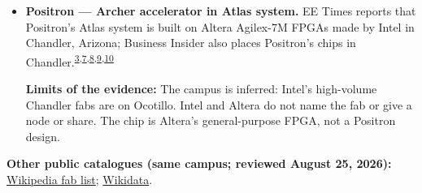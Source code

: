 \begin{minipage}[t][0.90\textheight][t]{\textwidth}
\begin{itemize}[leftmargin=1.25em,itemsep=0.35em,topsep=0.15em,parsep=0pt]
\item {\footnotesize\textbf{Positron --- Archer accelerator in Atlas system.} EE Times reports that Positron's Atlas system is built on Altera Agilex-7M FPGAs made by Intel in Chandler, Arizona; Business Insider also places Positron's chips in Chandler.\nobreak\textsuperscript{\href{\detokenize{https://web.archive.org/web/20260730143304/https://newsroom.intel.com/client-computing/intel-unveils-panther-lake-architecture-first-ai-pc-platform-built-on-18a}}{\textcolor{accent}{3}},\href{\detokenize{https://www.eetimes.com/startup-positron-takes-on-nvidia-with-fpgas/}}{\textcolor{accent}{7}},\href{\detokenize{https://finance.yahoo.com/news/pros-cons-making-advanced-chips-100002647.html}}{\textcolor{accent}{8}},\href{\detokenize{https://www.eetimes.com/positron-230-million-funding-led-by-financial-trading-firms/}}{\textcolor{accent}{9}},\href{\detokenize{https://www.positron.ai/atlas}}{\textcolor{accent}{10}}}\par {\scriptsize\color{black!62}\textbf{Limits of the evidence:} The campus is inferred: Intel's high-volume Chandler fabs are on Ocotillo. Intel and Altera do not name the fab or give a node or share. The chip is Altera's general-purpose FPGA, not a Positron design.\par}}
\end{itemize}
\smallskip
{\sffamily\scriptsize\color{black!62}\textbf{Other public catalogues (same campus; reviewed August 25, 2026):} \href{\detokenize{https://en.wikipedia.org/w/index.php?title=List_of_semiconductor_fabrication_plants&oldid=1370451124}\#\detokenize{Open_plants}}{Wikipedia fab list}; \href{\detokenize{https://www.wikidata.org/w/index.php?title=Q113325080&oldid=1694257473}}{Wikidata}.\par}
\medskip

\end{minipage}
